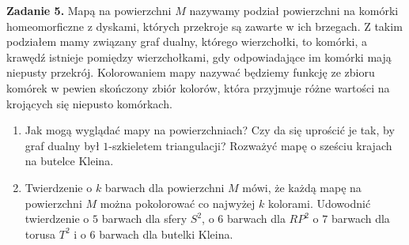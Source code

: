 \textbf{\large\color{orange}Zadanie 5.} Mapą na powierzchni $M$ nazywamy podział powierzchni na komórki homeomorficzne z dyskami, których przekroje są zawarte w ich brzegach. Z takim podziałem
mamy związany graf dualny, którego wierzchołki, to komórki, a krawędź istnieje
pomiędzy wierzchołkami, gdy odpowiadające im komórki mają niepusty przekrój.
Kolorowaniem mapy nazywać będziemy funkcję ze zbioru komórek w pewien skończony zbiór kolorów, która przyjmuje różne wartości na krojących się niepusto
komórkach.
\begin{enumerate}[label=(\alph*)]
  \item Jak mogą wyglądać mapy na powierzchniach? Czy da się uprościć je tak, by
graf dualny był $1$-szkieletem triangulacji? Rozważyć mapę o sześciu krajach
na butelce Kleina.
\item Twierdzenie o $k$ barwach dla powierzchni $M$ mówi, że każdą mapę na powierzchni $M$ można pokolorować co najwyżej $k$ kolorami. Udowodnić twierdzenie o $5$ barwach dla sfery $S^2$, o $6$ barwach dla $RP^2$ o $7$ barwach dla torusa
$T^2$ i o $6$ barwach dla butelki Kleina.
\end{enumerate}

\dotfill 

